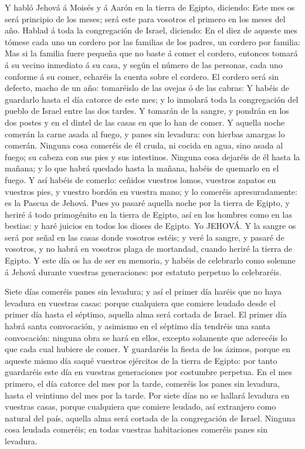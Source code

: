  Y habló Jehová á Moisés y á Aarón en la tierra de Egipto,
diciendo:  Este mes os será principio de los meses; será
este para vosotros el primero en los meses del año.  Hablad
á toda la congregación de Israel, diciendo: En el diez de aqueste mes
tómese cada uno un cordero por las familias de los padres, un cordero
por familia:  Mas si la familia fuere pequeña que no baste á
comer el cordero, entonces tomará á su vecino inmediato á su casa, y
según el número de las personas, cada uno conforme á su comer, echaréis
la cuenta sobre el cordero.  El cordero será sin defecto,
macho de un año: tomaréislo de las ovejas ó de las cabras: 
Y habéis de guardarlo hasta el día catorce de este mes; y lo inmolará
toda la congregación del pueblo de Israel entre las dos tardes.
 Y tomarán de la sangre, y pondrán en los dos postes y en el
dintel de las casas en que lo han de comer.  Y aquella noche
comerán la carne asada al fuego, y panes sin levadura: con hierbas
amargas lo comerán.  Ninguna cosa comeréis de él cruda, ni
cocida en agua, sino asada al fuego; su cabeza con sus pies y sus
intestinos.  Ninguna cosa dejaréis de él hasta la mañana; y
lo que habrá quedado hasta la mañana, habéis de quemarlo en el fuego.
 Y así habéis de comerlo: ceñidos vuestros lomos, vuestros
zapatos en vuestros pies, y vuestro bordón en vuestra mano; y lo
comeréis apresuradamente: es la Pascua de Jehová.  Pues yo
pasaré aquella noche por la tierra de Egipto, y heriré á todo
primogénito en la tierra de Egipto, así en los hombres como en las
bestias: y haré juicios en todos los dioses de Egipto. Yo JEHOVÁ.
 Y la sangre os será por señal en las casas donde vosotros
estéis; y veré la sangre, y pasaré de vosotros, y no habrá en vosotros
plaga de mortandad, cuando heriré la tierra de Egipto.  Y
este día os ha de ser en memoria, y habéis de celebrarlo como solemne á
Jehová durante vuestras generaciones: por estatuto perpetuo lo
celebraréis.

 Siete días comeréis panes sin levadura; y así el primer
día haréis que no haya levadura en vuestras casas: porque cualquiera que
comiere leudado desde el primer día hasta el séptimo, aquella alma será
cortada de Israel.  El primer día habrá santa convocación,
y asimismo en el séptimo día tendréis una santa convocación: ninguna
obra se hará en ellos, excepto solamente que aderecéis lo que cada cual
hubiere de comer.  Y guardaréis la fiesta de los ázimos,
porque en aqueste mismo día saqué vuestros ejércitos de la tierra de
Egipto: por tanto guardaréis este día en vuestras generaciones por
costumbre perpetua.  En el mes primero, el día catorce del
mes por la tarde, comeréis los panes sin levadura, hasta el veintiuno
del mes por la tarde.  Por siete días no se hallará
levadura en vuestras casas, porque cualquiera que comiere leudado, así
extranjero como natural del país, aquella alma será cortada de la
congregación de Israel.  Ninguna cosa leudada comeréis; en
todas vuestras habitaciones comeréis panes sin levadura.

